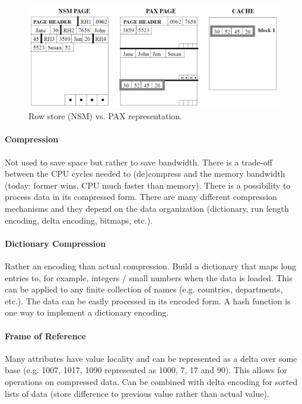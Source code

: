 \begin{figure}[h]
	\centering
	\includegraphics[scale=0.8]{images/2-pax.PNG}
	\caption{Row store (NSM) vs. PAX representation.}
	\label{fig:pax}
\end{figure}

\paragraph{Compression}
Not used to save space but rather to save bandwidth. There is a trade-off between the CPU cycles needed to (de)compress and the memory bandwidth (today: former wins, CPU much faster than memory). There is a possibility to process data in its compressed form. There are many different compression mechanisms and they depend on the data organization (dictionary, run length encoding, delta encoding, bitmaps, etc.).

\paragraph{Dictionary Compression}
Rather an encoding than actual compression. Build a dictionary that maps long entries to, for example, integers / small numbers when the data is loaded. This can be applied to any finite collection of names (e.g. countries, departments, etc.). The data can be easily processed in its encoded form. A hash function is one way to implement a dictionary encoding.

\paragraph{Frame of Reference}
Many attributes have value locality and can be represented as a delta over some base (e.g. 1007, 1017, 1090 represented as 1000, 7, 17 and 90). This allows for operations on compressed data. Can be combined with delta encoding for sorted lists of data (store difference to previous value rather than actual value).

